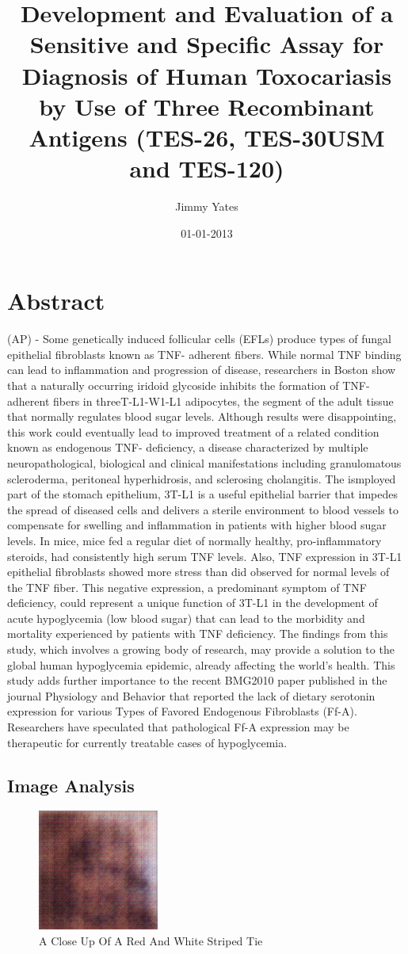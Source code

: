 \documentclass{article}%
\title{Development and Evaluation of a Sensitive and Specific Assay for Diagnosis of Human Toxocariasis by Use of Three Recombinant Antigens (TES{-}26, TES{-}30USM and TES{-}120)}%
\author{Jimmy Yates}%
\affil{Bellvitge Biomedical Research Institute (IDIBELL), Barcelona, Spain}%
\date{01{-}01{-}2013}%
\begin{document}
%
\normalsize%
\maketitle%
\section{Abstract}%
\label{sec:Abstract}%
(AP) {-} Some genetically induced follicular cells (EFLs) produce types of fungal epithelial fibroblasts known as TNF{-} adherent fibers. While normal TNF binding can lead to inflammation and progression of disease, researchers in Boston show that a naturally occurring iridoid glycoside inhibits the formation of TNF{-} adherent fibers in threeT{-}L1{-}W1{-}L1 adipocytes, the segment of the adult tissue that normally regulates blood sugar levels. Although results were disappointing, this work could eventually lead to improved treatment of a related condition known as endogenous TNF{-}  deficiency, a disease characterized by multiple neuropathological, biological and clinical manifestations including granulomatous scleroderma, peritoneal hyperhidrosis, and sclerosing cholangitis.\newline%
The ismployed part of the stomach epithelium, 3T{-}L1 is a useful epithelial barrier that impedes the spread of diseased cells and delivers a sterile environment to blood vessels to compensate for swelling and inflammation in patients with higher blood sugar levels. In mice, mice fed a regular diet of normally healthy, pro{-}inflammatory steroids, had consistently high serum TNF levels. Also, TNF expression in 3T{-}L1 epithelial fibroblasts showed more stress than did observed for normal levels of the TNF fiber. This negative expression, a predominant symptom of TNF deficiency, could represent a unique function of 3T{-}L1 in the development of acute hypoglycemia (low blood sugar) that can lead to the morbidity and mortality experienced by patients with TNF deficiency.\newline%
The findings from this study, which involves a growing body of research, may provide a solution to the global human hypoglycemia epidemic, already affecting the world's health. This study adds further importance to the recent BMG2010 paper published in the journal Physiology and Behavior that reported the lack of dietary serotonin expression for various Types of Favored Endogenous Fibroblasts (Ff{-}A). Researchers have speculated that pathological Ff{-}A expression may be therapeutic for currently treatable cases of hypoglycemia.

%
\subsection{Image Analysis}%
\label{subsec:ImageAnalysis}%


\begin{figure}[h!]%
\centering%
\includegraphics[width=150px]{500_fake_images/samples_5_257.png}%
\caption{A Close Up Of A Red And White Striped Tie}%
\end{figure}

%
\end{document}
